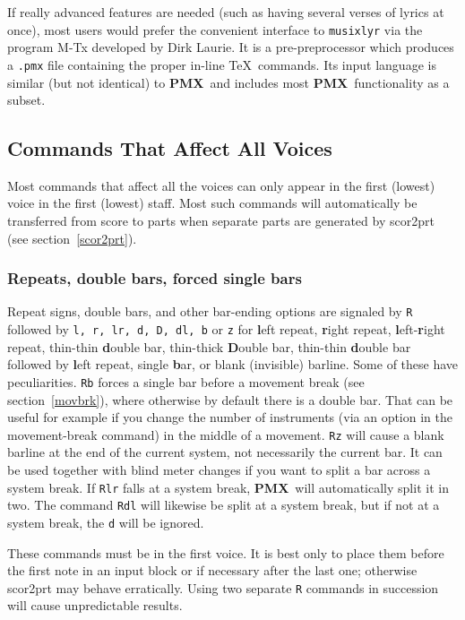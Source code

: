 \documentclass[11pt]{article}
\newcommand\PMXX{\textbf{PMX}}
\newcommand\PMX{\PMXX~}
\def\newfrom{2.59}  %
\def\NEW#1{\ifdim#1 pt<\newfrom pt\else%
\marginpar{\fbox{#1}}\fi}
\begin{document}
If really advanced features are needed (such as having several verses of lyrics 
at once), most users would prefer the convenient interface to {\tt musixlyr} via 
the program {\bfx M-Tx} developed by Dirk Laurie. It is a pre-preprocessor which produces 
a {\tt .pmx} file containing the proper in-line \TeX\ commands. Its input language 
is similar (but not identical) to \PMX and includes most \PMX functionality as a subset.

\subsection{Commands That Affect All Voices}  \label{pmxcmds}

	Most commands that affect all the voices can only appear in the first 
(lowest) voice in the first (lowest) staff. Most such commands will 
automatically be 
transferred from score to parts when separate parts are generated by 
{\bfx scor2prt} (see section~\ref{scor2prt}). 

\subsubsection{Repeats, double bars, forced single bars} \label{Repeats}

	Repeat signs, double bars, and other bar-ending options are signaled 
by {\tt R} followed by 
{\tt l, r, lr, d, D, dl, b} or {\tt z} for 
{\bf l}eft repeat, {\bf r}ight repeat, {\bf l}eft-{\bf r}ight repeat, 
thin-thin {\bf d}ouble 
bar, thin-thick {\bf D}ouble bar, thin-thin {\bf d}ouble bar followed by
{\bf l}eft repeat, single {\bf b}ar, or blank (invisible) barline\NEW{2.4}. 
Some of these have peculiarities.
{\tt Rb} forces a single bar before a movement break (see section~\ref{movbrk}), 
where otherwise by default there is a double bar.  That can be useful for
example if you
change the number of instruments (via an option in the movement-break command)
in the middle of a movement.  {\tt Rz} will cause a blank barline at the end
of the current system, not necessarily the current bar. It can be used 
together with blind meter changes if you want to split a bar across a
system break.  
If {\tt Rlr} falls at a system break, \PMX will automatically split it in 
two.  The command {\tt Rdl} will likewise be split at a system break, but if
not at a system break, the {\tt d} will be ignored. 

These commands must be in the 
first voice.  It is best only to place them before the first note in an 
input block or if necessary after the last one; otherwise {\bfx scor2prt} 
may behave erratically.  
Using two separate {\tt R} commands in succession will cause 
unpredictable results.  
\end{document}
